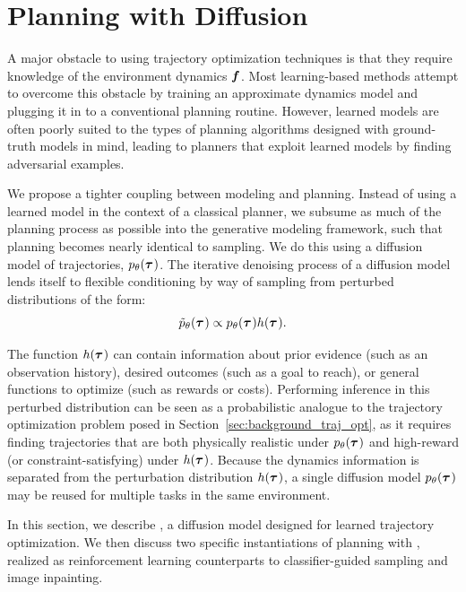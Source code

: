 \section{Planning with Diffusion}
\label{sec:method}

A major obstacle to using trajectory optimization techniques is that they require knowledge of the environment dynamics ${\bm{f}}$.
Most learning-based methods attempt to overcome this obstacle by training an approximate dynamics model and plugging it in to a conventional planning routine.
However, learned models are often poorly suited to the types of planning algorithms designed with ground-truth models in mind, leading to planners that exploit learned models by finding adversarial examples.

We propose a tighter coupling between modeling and planning.
Instead of using a learned model in the context of a classical planner, we subsume as much of the planning process as possible into the generative modeling framework, such that planning becomes nearly identical to sampling.
We do this using a diffusion model of trajectories, $p_\theta(\bm{\tau}^{})$.
The iterative denoising process of a diffusion model lends itself to flexible conditioning by way of sampling from perturbed distributions of the form:
\begin{equation}
\label{eq:perturbed}
\tilde{p}_\theta(\bm{\tau}^{}) \propto p_\theta(\bm{\tau}^{}) h(\bm{\tau}^{}).
\end{equation}

The function $h(\bm{\tau}^{})$ can contain information about prior evidence (such as an observation history), desired outcomes (such as a goal to reach), or general functions to optimize (such as rewards or costs).
Performing inference in this perturbed distribution can be seen as a probabilistic analogue to the trajectory optimization problem posed in Section~\ref{sec:background_traj_opt}, as it requires finding trajectories that are both physically realistic under $p_\theta(\bm{\tau}^{})$ and high-reward (or constraint-satisfying) under $h(\bm{\tau}^{})$.
Because the dynamics information is separated from the perturbation distribution $h(\bm{\tau}^{})$, a single diffusion model $p_\theta(\bm{\tau}^{})$ may be reused for multiple tasks in the same environment.

In this section, we describe \method, a diffusion model designed for learned trajectory optimization.
We then discuss two specific instantiations of planning with \method, realized as reinforcement learning counterparts to classifier-guided sampling and image inpainting.

